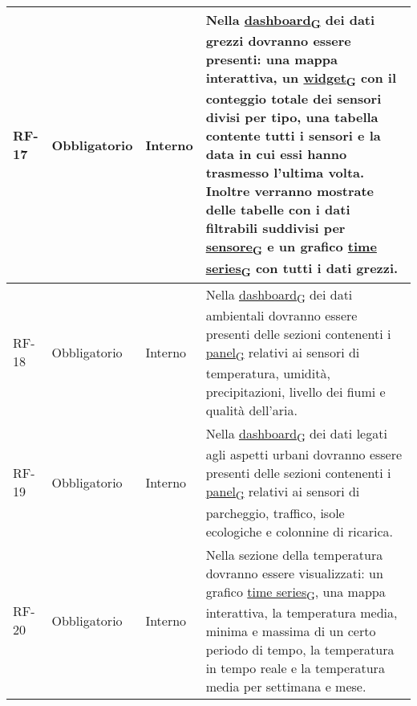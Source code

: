 \begin{longtable}{|>{\centering\arraybackslash}m{}|>{\centering\arraybackslash}m{}|>{\centering\arraybackslash}m{}|>{\centering\arraybackslash}m{}|}
	RF-17           & Obbligatorio        & Interno                                                                                                           & Nella \href{https://7last.github.io/docs/pb/documentazione-interna/glossario\#dashboard}{dashboard\textsubscript{G}} dei dati grezzi dovranno essere presenti: una mappa interattiva, un \href{https://7last.github.io/docs/pb/documentazione-interna/glossario\#widget}{widget\textsubscript{G}} con il conteggio totale dei sensori divisi per tipo, una tabella contente tutti i sensori e la data in cui essi hanno trasmesso l'ultima volta. Inoltre verranno mostrate delle tabelle con i dati filtrabili suddivisi per \href{https://7last.github.io/docs/pb/documentazione-interna/glossario\#sensore}{sensore\textsubscript{G}} e un grafico \href{https://7last.github.io/docs/pb/documentazione-interna/glossario\#time-series}{time series\textsubscript{G}} con tutti i dati grezzi.
	\\\hline
	RF-18           & Obbligatorio        & Interno                                                                                                           & Nella \href{https://7last.github.io/docs/pb/documentazione-interna/glossario\#dashboard}{dashboard\textsubscript{G}} dei dati ambientali dovranno essere presenti delle sezioni contenenti i \href{https://7last.github.io/docs/pb/documentazione-interna/glossario\#panel}{panel\textsubscript{G}} relativi ai sensori di temperatura, umidità, precipitazioni, livello dei fiumi e qualità dell'aria.
	\\\hline
	RF-19           & Obbligatorio        & Interno                                                                                                           & Nella \href{https://7last.github.io/docs/pb/documentazione-interna/glossario\#dashboard}{dashboard\textsubscript{G}} dei dati legati agli aspetti urbani dovranno essere presenti delle sezioni contenenti i \href{https://7last.github.io/docs/pb/documentazione-interna/glossario\#panel}{panel\textsubscript{G}} relativi ai sensori di parcheggio, traffico, isole ecologiche e colonnine di ricarica.
	\\\hline
	RF-20           & Obbligatorio        & Interno                                                                                                           & Nella sezione della temperatura dovranno essere visualizzati: un grafico \href{https://7last.github.io/docs/pb/documentazione-interna/glossario\#time-series}{time series\textsubscript{G}}, una mappa interattiva, la temperatura media, minima e massima di un certo periodo di tempo, la temperatura in tempo reale e la temperatura media per settimana e mese.

\end{longtable}
